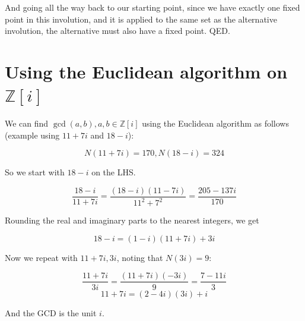 \documentclass{article}
\begin{document}
And going all the way back to our starting point, since we have exactly one fixed point
in this involution, and it is applied to the same set as the alternative involution,
the alternative must also have a fixed point. QED.


\appendix

\section{Using the Euclidean algorithm on $\mathbb{Z}[i]$}

We can find $\gcd(a,b), a,b \in \mathbb{Z}[i]$ using the Euclidean algorithm
as follows (example using $11 + 7i$ and $18 - i$):

\[N(11+7i) = 170, N(18-i)=324 \]

So we start with $18-i$ on the LHS.

\[ \frac{18 - i}{11 + 7i} = \frac{(18 - i)(11 - 7i)}{11^2+7^2} = \frac{205 - 137i}{170} \]

Rounding the real and imaginary parts to the nearest integers, we get 

\[ 18 - i = (1 - i)(11 + 7i) + 3i \]

Now we repeat with $11 + 7i, 3i$, noting that $N(3i) = 9$:

\[ \frac{11+7i}{3i} = \frac{(11 + 7i)(-3i)}{9} = \frac{7 -11i}{3} \]
\[ 11 + 7i = (2 - 4i)(3i) +i \]

And the GCD is the unit $i$.
\end{document}
